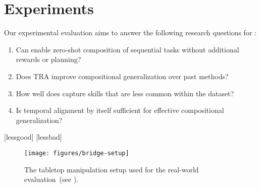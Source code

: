 \section{Experiments}
\label{sec:experiments}

Our experimental evaluation aims to answer the following research questions for \Method{}:
\begin{enumerate}[itemsep=0pt,parsep=0pt,topsep=0pt]
    \item Can \Method{} enable zero-shot composition of sequential tasks without additional rewards or planning?
    \item Does TRA improve compositional generalization over past methods?
           \item How well does \Method{} capture skills that are less common within the dataset?
    \item Is temporal alignment by itself sufficient for effective compositional generalization?
          
          \end{enumerate}



\makeatletter

\gdef\setname#1{\def\tmp@{{\checksetcolors(#1)\color{\cachedata}\raise -2.5pt\hbox to1em{\hss \tikz \node[circle,draw,inner sep=.5pt,outer sep=0pt,align=center]{\bfseries\textsf{\expandafter\char\the\numexpr`A-1+#1\relax}};\hss}}}\@ifstar{\hypertarget{set#1}{\tmp@}}{\hyperlink{set#1}{\tmp@}}}
\newarray\setcolors
{}[lessgood]
[lessbad]

\makeatother

\gdef\cluster#1{\hypertarget{set#1}{{\checksetcolors(#1)\color{\cachedata}\scriptsize\raisebox{.8pt}(\raisebox{.4pt}{\scriptsize\textsf{\expandafter\char\the\numexpr `A-1+#1\relax}}\raisebox{.8pt})}}}
\begin{figure}[htb]
    \centering
    \texttt{[image: figures/bridge-setup]}
    \caption{The tabletop manipulation setup used for the real-world evaluation~(see \citealp{walke2023bridgedata}).}
    \label{fig:bridge-setup}
\end{figure}

